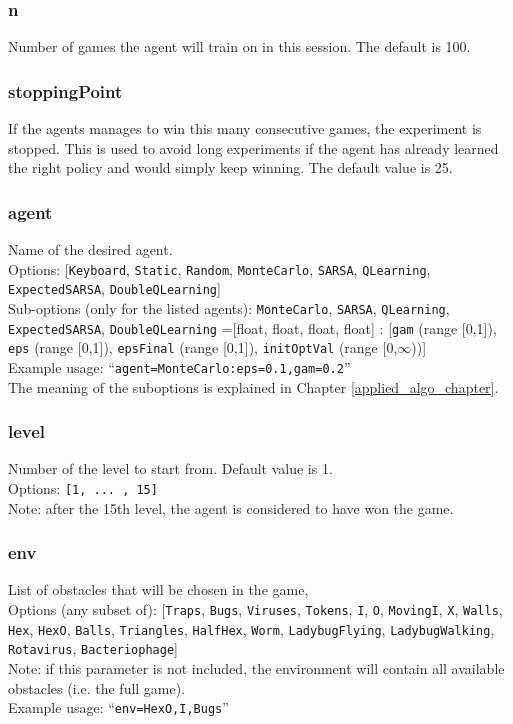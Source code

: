 \subsubsection*{n}
\label{opt:n}
Number of games the agent will train on in this session. The default is 100.

\subsubsection*{stoppingPoint}
\label{opt:stoppingPoint}
If the agents manages to win this many consecutive games, the experiment is stopped. This is used to avoid long experiments if the agent has already learned the right policy and would simply keep winning. The default value is 25.

\subsubsection*{agent}
\label{opt:agent}
Name of the desired agent. \\
Options: [\texttt{Keyboard}, \texttt{Static}, \texttt{Random}, \texttt{MonteCarlo}, \texttt{SARSA}, \texttt{QLearning}, \\ \texttt{ExpectedSARSA}, \texttt{DoubleQLearning}]\\
Sub-options (only for the listed agents):
\texttt{MonteCarlo}, \texttt{SARSA}, \texttt{QLearning}, \texttt{ExpectedSARSA}, \texttt{DoubleQLearning}
=[float, float, float, float] :
[\texttt{gam} (range [0,1]), \texttt{eps} (range [0,1]), \texttt{epsFinal} (range [0,1]), \texttt{initOptVal} (range [0,$\infty$))]\\
Example usage: ``\texttt{agent=MonteCarlo:eps=0.1,gam=0.2}''\\
The meaning of the suboptions is explained in Chapter \ref{applied_algo_chapter}.

\subsubsection*{level}
\label{opt:level}
Number of the level to start from. Default value is 1.\\
Options: \texttt{[1, ... , 15]}\\
Note: after the 15th level, the agent is considered to have won the game.

\subsubsection*{env}
\label{opt:env}
List of obstacles that will be chosen in the game,\\
Options (any subset of): [\texttt{Traps}, \texttt{Bugs}, \texttt{Viruses}, \texttt{Tokens},
\texttt{I}, \texttt{O}, \texttt{MovingI}, \texttt{X}, \texttt{Walls}, \texttt{Hex},
\texttt{HexO}, \texttt{Balls}, \texttt{Triangles}, \texttt{HalfHex},
\texttt{Worm}, \texttt{LadybugFlying}, \texttt{LadybugWalking},
\texttt{Rotavirus}, \texttt{Bacteriophage}]\\
Note: if this parameter is not included, the environment will contain all available obstacles (i.e. the full game).\\
Example usage: ``\texttt{env=HexO,I,Bugs}''\\

